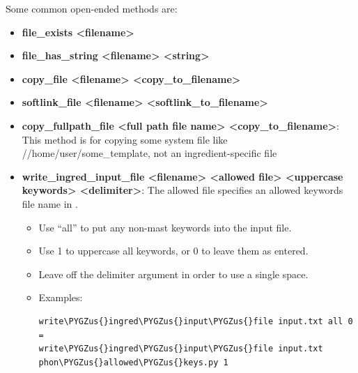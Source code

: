 \documentclass[letterpaper,10pt,english]{sphinxmanual}
\def\PYGZus{\char`\_}
\begin{document}
Some common open-ended methods are:
\begin{itemize}
\item {} 
\textbf{file\_exists \textless{}filename\textgreater{}}

\item {} 
\textbf{file\_has\_string \textless{}filename\textgreater{} \textless{}string\textgreater{}}

\item {} 
\textbf{copy\_file \textless{}filename\textgreater{} \textless{}copy\_to\_filename\textgreater{}}

\item {} 
\textbf{softlink\_file \textless{}filename\textgreater{} \textless{}softlink\_to\_filename\textgreater{}}

\item {} 
\textbf{copy\_fullpath\_file \textless{}full path file name\textgreater{} \textless{}copy\_to\_filename\textgreater{}}: This method is for copying some system file like //home/user/some\_template, not an ingredient-specific file

\item {} 
\textbf{write\_ingred\_input\_file \textless{}filename\textgreater{} \textless{}allowed file\textgreater{} \textless{}uppercase keywords\textgreater{} \textless{}delimiter\textgreater{}}: The allowed file specifies an allowed keywords file name in .
\begin{itemize}
\item {} 
Use ``all'' to put any non-mast keywords into the input file.

\item {} 
Use 1 to uppercase all keywords, or 0 to leave them as entered.

\item {} 
Leave off the delimiter argument in order to use a single space.

\item {} 
Examples:

\begin{Verbatim}[commandchars=\\\{\}]
write\PYGZus{}ingred\PYGZus{}input\PYGZus{}file input.txt all 0 =
write\PYGZus{}ingred\PYGZus{}input\PYGZus{}file input.txt phon\PYGZus{}allowed\PYGZus{}keys.py 1
\end{Verbatim}

\end{itemize}


\end{itemize}
\end{document}
